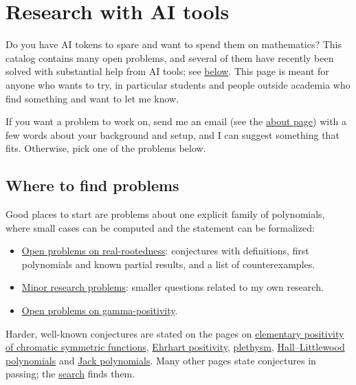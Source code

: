 
\section[aiResearch]{Research with AI tools}

Do you have AI tokens to spare and want to spend them on mathematics?  This
catalog contains many open problems, and several of them have recently been
solved with substantial help from AI tools; see
\hyperref[aiResearchSolved]{below}.  This page is meant for anyone who wants
to try, in particular students and people outside academia who find
something and want to let me know.

If you want a problem to work on, send me an email (see the
\hyperref[about]{about page}) with a few words about your background and
setup, and I can suggest something that fits.  Otherwise, pick one of the
problems below.

\subsection[aiResearchProblems]{Where to find problems}

Good places to start are problems about one explicit family of polynomials,
where small cases can be computed and the statement can be formalized:
\begin{itemize}
\item \hyperref[realrootedOpenProblems]{Open problems on real-rootedness}:
conjectures with definitions, first polynomials and known partial results,
and a list of counterexamples.
\item \hyperref[personalMinorProblems]{Minor research problems}: smaller
questions related to my own research.
\item \hyperref[gammaPositivityOpenProblems]{Open problems on
gamma-positivity}.
\end{itemize}
Harder, well-known conjectures are stated on the pages on
\hyperref[chromaticEExpansionConjectures]{elementary positivity of chromatic
symmetric functions}, \hyperref[ehrhartConjecturalPositivity]{Ehrhart
positivity}, \hyperref[plethysmProblems]{plethysm},
\hyperref[hallLittlewoodConjectures]{Hall--Littlewood polynomials} and
\hyperref[jackCharacterConjecture]{Jack polynomials}.  Many other pages state
conjectures in passing; the
\href{https://www.symmetricfunctions.com/search.htm}{search} finds them.

